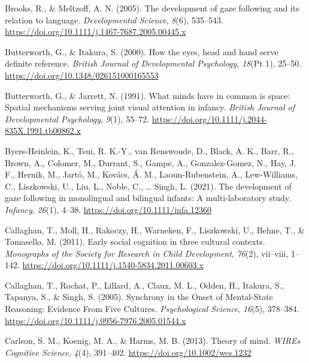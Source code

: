 \documentclass[
]{scrbook}
\newlength{\cslhangindent}
\newenvironment{CSLReferences}[2] %
 {\begin{list}{}{%
  \setlength{\itemindent}{0pt}
  \setlength{\leftmargin}{0pt}
  \setlength{\parsep}{0pt}
  \ifodd #1
   \setlength{\leftmargin}{\cslhangindent}
   \setlength{\itemindent}{-1\cslhangindent}
  \fi
  \setlength{\itemsep}{#2\baselineskip}}}
 {\end{list}}
\begin{document}
\begin{CSLReferences}{1}{0}
Brooks, R., \& Meltzoff, A. N. (2005). The development of gaze following and its relation to language. \emph{Developmental Science}, \emph{8}(6), 535--543. \url{https://doi.org/10.1111/j.1467-7687.2005.00445.x}

Butterworth, G., \& Itakura, S. (2000). How the eyes, head and hand serve definite reference. \emph{British Journal of Developmental Psychology}, \emph{18}(Pt 1), 25--50. \url{https://doi.org/10.1348/026151000165553}

Butterworth, G., \& Jarrett, N. (1991). What minds have in common is space: {Spatial} mechanisms serving joint visual attention in infancy. \emph{British Journal of Developmental Psychology}, \emph{9}(1), 55--72. \url{https://doi.org/10.1111/j.2044-835X.1991.tb00862.x}

Byers-Heinlein, K., Tsui, R. K.-Y., van Renswoude, D., Black, A. K., Barr, R., Brown, A., Colomer, M., Durrant, S., Gampe, A., Gonzalez-Gomez, N., Hay, J. F., Hernik, M., Jartó, M., Kovács, Á. M., Laoun-Rubenstein, A., Lew-Williams, C., Liszkowski, U., Liu, L., Noble, C., \ldots{} Singh, L. (2021). The development of gaze following in monolingual and bilingual infants: {A} multi-laboratory study. \emph{Infancy}, \emph{26}(1), 4--38. \url{https://doi.org/10.1111/infa.12360}

Callaghan, T., Moll, H., Rakoczy, H., Warneken, F., Liszkowski, U., Behne, T., \& Tomasello, M. (2011). Early social cognition in three cultural contexts. \emph{Monographs of the Society for Research in Child Development}, \emph{76}(2), vii--viii, 1--142. \url{https://doi.org/10.1111/j.1540-5834.2011.00603.x}

Callaghan, T., Rochat, P., Lillard, A., Claux, M. L., Odden, H., Itakura, S., Tapanya, S., \& Singh, S. (2005). Synchrony in the {Onset} of {Mental-State Reasoning}: {Evidence From Five Cultures}. \emph{Psychological Science}, \emph{16}(5), 378--384. \url{https://doi.org/10.1111/j.0956-7976.2005.01544.x}

Carlson, S. M., Koenig, M. A., \& Harms, M. B. (2013). Theory of mind. \emph{WIREs Cognitive Science}, \emph{4}(4), 391--402. \url{https://doi.org/10.1002/wcs.1232}


\end{CSLReferences}
\end{document}
